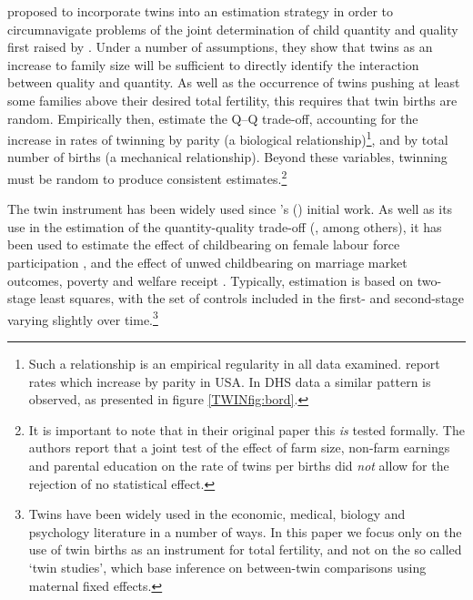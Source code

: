 \documentclass[subeqn]{article}
\begin{document}
\begin{spacing}{1.4}
\citet{RosenzweigWolpin1980} proposed to incorporate twins into an estimation
strategy in order to circumnavigate problems of the joint determination of child 
quantity and quality first raised by \citet{Becker1960,BeckerLewis1973,
BeckerTomes1976}.  Under a number of assumptions, they show that twins as an 
increase to family size will be sufficient to directly identify the interaction
between quality and quantity.  As well as the occurrence of twins pushing at
least some families above their desired total fertility, this requires that 
twin births are random.  Empirically then, \citet{RosenzweigWolpin1980} estimate 
the Q--Q trade-off, accounting for the increase in rates of twinning by parity 
(a biological relationship)\footnote{Such a relationship is an empirical 
regularity in all data examined. \citet{RosenzweigWolpin1980} report rates which 
increase by parity in USA.  In DHS data a similar pattern is observed, as 
presented in figure \ref{TWINfig:bord}.}, and by total number of births (a 
mechanical relationship).  Beyond these variables, twinning must be random to
produce consistent estimates.\footnote{It is important to note that in their
original paper this \emph{is} tested formally.  The authors report that a joint
test of the effect of farm size, non-farm earnings and parental education on the
rate of twins per births did \emph{not} allow for the rejection of no 
statistical effect.}

The twin instrument has been widely used since \citeauthor{RosenzweigWolpin1980}'s
(\citeyear{RosenzweigWolpin1980}) initial work. As well as its use in the 
estimation of the quantity-quality trade-off (\citet{Blacketal2005,Caceres2006,
Lietal2008,Angristetal2010}, among others), it has been used to 
estimate the effect of childbearing on female labour force participation 
\citep{RosenzweigWolpin1980b,Jacobsenetal1999,AngristEvans1998}, and the effect 
of unwed childbearing on marriage market outcomes, poverty and welfare receipt 
\citep{BronarsGrogger1994}.  Typically, estimation is based on two-stage least
squares, with the set of controls included in the first- and second-stage 
varying slightly over time.\footnote{Twins have been widely used in the economic, 
medical, biology and psychology literature in a number of ways.  In this paper 
we focus only on the use of twin births as an instrument for total fertility, 
and not on the so called `twin studies', which base inference on between-twin 
comparisons using maternal fixed effects.}


\end{spacing}
\end{document}
